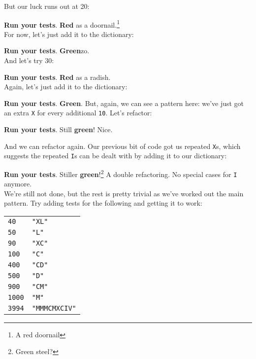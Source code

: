 But our luck runs out at 20:



\textbf{Run your tests}. \textbf{Red} as a doornail.\footnote{A red doornail}
\\

For now, let's just add it to the dictionary:


\textbf{Run your tests}. \textbf{Green}zo.
\\

And let's try 30:



\textbf{Run your tests}. \textbf{Red} as a radish.
\\

Again, let's just add it to the dictionary:



\textbf{Run your tests}. \textbf{Green}. But, again, we can see a pattern here: we've just got an extra \texttt{X} for every additional \texttt{10}. Let's refactor:



\textbf{Run your tests}. Still \textbf{green}! Nice.

\pagebreak

And we can refactor again. Our previous bit of code got us repeated \texttt{X}s, which suggests the repeated \texttt{I}s can be dealt with by adding it to our dictionary:



\textbf{Run your tests}. Stiller \textbf{green}!\footnote{Green steel?} A double refactoring. No special cases for \texttt{I} anymore.
\\

We're still not done, but the rest is pretty trivial as we've worked out the main pattern. Try adding tests for the following and getting it to work:
\\

\begin{small}
    \begin{tabularx}{\textwidth}{l X}
        \texttt{40} & \texttt{"XL"} \\
        \texttt{50} & \texttt{"L"} \\
        \texttt{90} & \texttt{"XC"} \\
        \texttt{100} & \texttt{"C"} \\
        \texttt{400} & \texttt{"CD"} \\
        \texttt{500} & \texttt{"D"} \\
        \texttt{900} & \texttt{"CM"} \\
        \texttt{1000} & \texttt{"M"} \\
        \texttt{3994} & \texttt{"MMMCMXCIV"} \\
    \end{tabularx}
\end{small}

